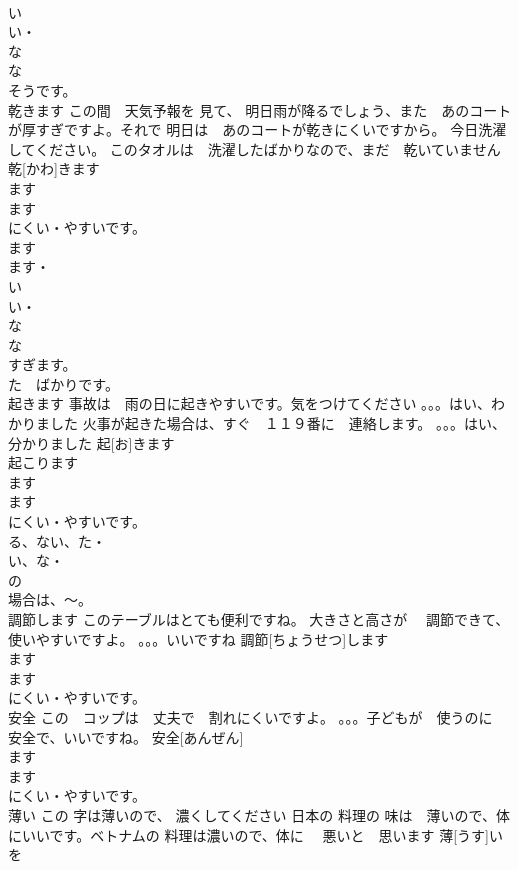 \documentclass[8pt]{extreport}
\begin{document}
\begin{CJK}{UTF8}{min}
\\	い　
\\	い・
\\	な 
\\	な 
\\	そうです。
\\	乾きます	この間　天気予報を 見て、 明日雨が降るでしょう、また　あのコートが厚すぎですよ。それで 明日は　あのコートが乾きにくいですから。 今日洗濯してください。 このタオルは　洗濯したばかりなので、まだ　乾いていません	乾[かわ]きます			
\\	ます　
\\	ます
\\	にくい・やすいです。
\\	ます　
\\	ます・
\\	い
\\	い・
\\	な
\\	な
\\	すぎます。
\\	た　ばかりです。
\\	起きます	事故は　雨の日に起きやすいです。気をつけてください 。。。はい、わかりました 火事が起きた場合は、すぐ　１１９番に　連絡します。 。。。はい、分かりました	起[お]きます			
\\	起こります	
\\	ます　
\\	ます
\\	にくい・やすいです。
\\	る、ない、た・
\\	い、な・
\\	の
\\	場合は、～。
\\	調節します	このテーブルはとても便利ですね。 大きさと高さが　 調節できて、 使いやすいですよ。 。。。いいですね	調節[ちょうせつ]します				
\\	ます　
\\	ます
\\	にくい・やすいです。
\\	安全	この　コップは　丈夫で　割れにくいですよ。 。。。子どもが　使うのに　安全で、いいですね。	安全[あんぜん]				
\\	ます　
\\	ます
\\	にくい・やすいです。
\\	薄い	この 字は薄いので、 濃くしてください 日本の 料理の 味は　薄いので、体にいいです。ベトナムの 料理は濃いので、体に　 悪いと　思います	薄[うす]い				
\\	を

\end{CJK}
\end{document}
